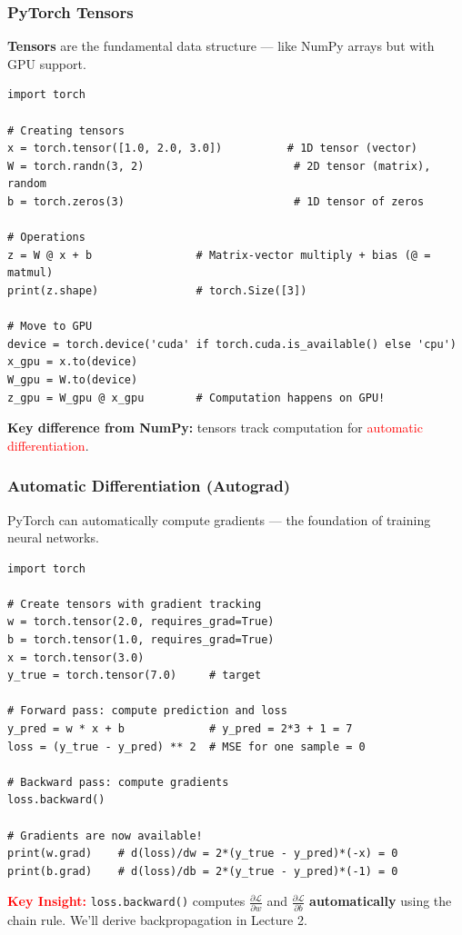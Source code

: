 \documentclass[notes,11pt, aspectratio=169]{beamer}
\begin{document}
\begin{frame}[fragile]
\frametitle{PyTorch Tensors}

\textbf{Tensors} are the fundamental data structure --- like NumPy arrays but with GPU support.

\vspace{4pt}
\begin{lstlisting}
import torch

# Creating tensors
x = torch.tensor([1.0, 2.0, 3.0])          # 1D tensor (vector)
W = torch.randn(3, 2)                       # 2D tensor (matrix), random
b = torch.zeros(3)                          # 1D tensor of zeros

# Operations
z = W @ x + b                # Matrix-vector multiply + bias (@ = matmul)
print(z.shape)               # torch.Size([3])

# Move to GPU
device = torch.device('cuda' if torch.cuda.is_available() else 'cpu')
x_gpu = x.to(device)
W_gpu = W.to(device)
z_gpu = W_gpu @ x_gpu        # Computation happens on GPU!
\end{lstlisting}

\vspace{4pt}
\textbf{Key difference from NumPy:} tensors track computation for \textcolor{red}{automatic differentiation}.
\end{frame}

\begin{frame}[fragile]
\frametitle{Automatic Differentiation (Autograd)}

PyTorch can automatically compute gradients --- the foundation of training neural networks.

\begin{lstlisting}
import torch

# Create tensors with gradient tracking
w = torch.tensor(2.0, requires_grad=True)
b = torch.tensor(1.0, requires_grad=True)
x = torch.tensor(3.0)
y_true = torch.tensor(7.0)     # target

# Forward pass: compute prediction and loss
y_pred = w * x + b             # y_pred = 2*3 + 1 = 7
loss = (y_true - y_pred) ** 2  # MSE for one sample = 0

# Backward pass: compute gradients
loss.backward()

# Gradients are now available!
print(w.grad)    # d(loss)/dw = 2*(y_true - y_pred)*(-x) = 0
print(b.grad)    # d(loss)/db = 2*(y_true - y_pred)*(-1) = 0
\end{lstlisting}

\vspace{4pt}
\textcolor{red}{\textbf{Key Insight:}} \texttt{loss.backward()} computes $\frac{\partial \mathcal{L}}{\partial w}$ and $\frac{\partial \mathcal{L}}{\partial b}$ \textbf{automatically} using the chain rule. We'll derive backpropagation in Lecture 2.
\end{frame}
\end{document}
